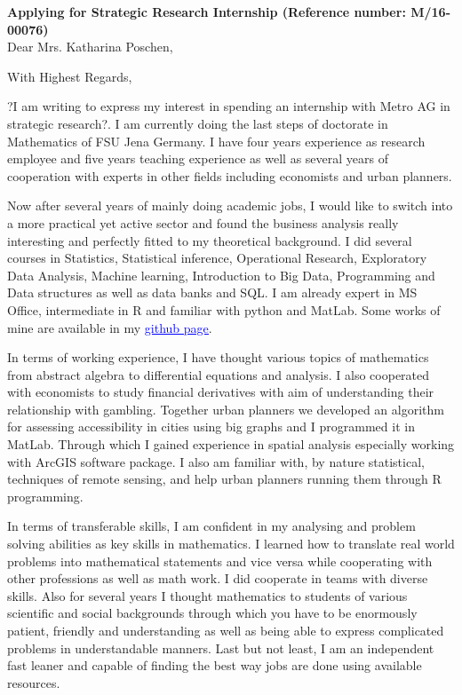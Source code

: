 \documentclass[11pt,a4paper,sans]{moderncv}        %
\title{}                               %
\begin{document}
\date{May 17, 2016}
\opening{\textbf{Applying for  Strategic Research Internship (Reference number: M/16-00076)}\\Dear Mrs. Katharina Poschen,}
\closing{With Highest Regards,}
\makelettertitle

?I am writing to express my interest in spending an internship with Metro AG in strategic research?. I am currently doing the last steps of doctorate in Mathematics of FSU Jena Germany. I have four years experience as research employee and five years teaching experience as well as several years of cooperation with experts in other fields including economists and urban planners.

Now after several years of mainly doing academic jobs, I would like to switch into a more practical yet active sector and found the business analysis really interesting and perfectly fitted to my theoretical background. I did several courses in Statistics, Statistical inference, Operational Research, Exploratory Data Analysis,  Machine learning, Introduction to Big Data, Programming and Data structures as well as data banks and SQL. I am already expert in MS Office, intermediate in R and familiar with python and MatLab. Some works of mine are available in my  \href{https://github.com/srhumir}{\textcolor{blue}{\underline{github page}}}. 

In terms of working experience, I have thought various topics of mathematics from abstract algebra to differential equations and analysis. I also cooperated with economists to study financial derivatives with aim of understanding their relationship with gambling. Together urban planners we developed an algorithm for assessing accessibility in cities using big graphs and I programmed it in MatLab. Through which I gained experience in spatial analysis especially working with ArcGIS software package. I also am familiar with, by nature statistical, techniques of remote sensing, and help urban planners running them through R programming.

In terms of transferable skills, I am confident in my analysing and problem solving abilities as key skills in mathematics. I learned how to translate real world problems into mathematical statements and vice versa while cooperating with other professions as well as math work. I did cooperate in teams with diverse skills. Also for several years I thought mathematics to students of various scientific and social backgrounds through which you have to be enormously patient, friendly and understanding as well as being able to express complicated problems in understandable manners. Last but not least, I am an independent fast leaner and capable of finding the best way jobs are done using available resources.
\end{document}
